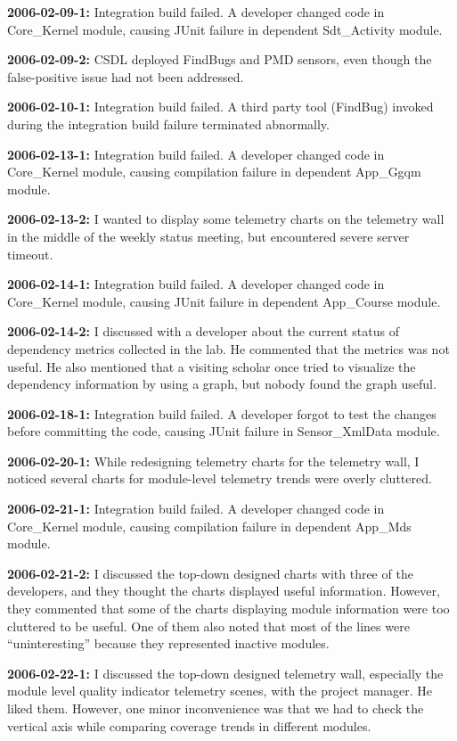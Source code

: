 \textbf{2006-02-09-1:}
Integration build failed. A developer changed code in Core\_Kernel module, causing JUnit failure in dependent Sdt\_Activity module. 

\textbf{2006-02-09-2:}
CSDL deployed FindBugs and PMD sensors, even though the false-positive issue had not been addressed.

\textbf{2006-02-10-1:}
Integration build failed. A third party tool (FindBug) invoked during the integration build failure terminated abnormally.

\textbf{2006-02-13-1:}
Integration build failed. A developer changed code in Core\_Kernel module, causing compilation failure in dependent App\_Ggqm module. 

\textbf{2006-02-13-2:}
I wanted to display some telemetry charts on the telemetry wall in the middle of the weekly status meeting, but encountered severe server timeout.

\textbf{2006-02-14-1:}
Integration build failed. A developer changed code in Core\_Kernel module, causing JUnit failure in dependent App\_Course module. 

\textbf{2006-02-14-2:}
I discussed with a developer about the current status of dependency metrics collected in the lab. He commented that the metrics was not useful. He also mentioned that a visiting scholar once tried to visualize the dependency information by using a graph, but nobody found the graph useful. 

\textbf{2006-02-18-1:}
Integration build failed. A developer forgot to test the changes before committing the code, causing JUnit failure in Sensor\_XmlData module.

\textbf{2006-02-20-1:}
While redesigning telemetry charts for the telemetry wall, I noticed several charts for module-level telemetry trends were overly cluttered.

\textbf{2006-02-21-1:}
Integration build failed. A developer changed code in Core\_Kernel module, causing compilation failure in dependent App\_Mds module. 

\textbf{2006-02-21-2:}
I discussed the top-down designed charts with three of the developers, and they thought the charts displayed useful information.
However, they commented that some of the charts displaying module information were too cluttered to be useful. One of them also noted that most of the lines were ``uninteresting'' because they represented inactive modules.

\textbf{2006-02-22-1:}
I discussed the top-down designed telemetry wall, especially the module level quality indicator telemetry scenes, with the project manager. He liked them. However, one minor inconvenience was that we had to check the vertical axis while comparing coverage trends in different modules.  

